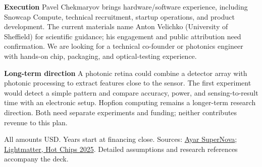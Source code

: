 \documentclass[10pt]{article}
\newcommand{\labelled}[1]{\textbf{\color{accent}#1}\quad}
\begin{document}
\labelled{Execution}
Pavel Chekmaryov brings hardware/software experience, including Snowcap Compute, technical recruitment, startup operations, and product development. The current materials name Anton Velichko (University of Sheffield) for scientific guidance; his engagement and public attribution need confirmation. We are looking for a technical co-founder or photonics engineer with hands-on chip, packaging, and optical-testing experience.

\labelled{Long-term direction}
A photonic retina could combine a detector array with photonic processing to extract features close to the sensor. The first experiment would detect a simple pattern and compare accuracy, power, and sensing-to-result time with an electronic setup. Hopfion computing remains a longer-term research direction. Both need separate experiments and funding; neither contributes revenue to this plan.

{\scriptsize All amounts USD. Years start at financing close. Sources: \href{https://ayarlabs.com/supernova}{Ayar SuperNova}; \href{https://lightmatter.co/wp-content/uploads/2025/08/57-lightmatter_hotchips_2025_final.pdf}{Lightmatter, Hot Chips 2025}. Detailed assumptions and research references accompany the deck.}
\end{document}
